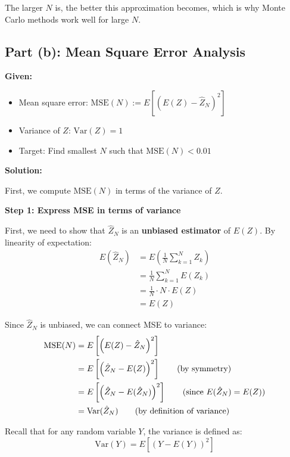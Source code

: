 \documentclass[11pt]{article}
\begin{document}
The larger $N$ is, the better this approximation becomes, which is why Monte Carlo methods work well for large $N$.

\vspace{1em}

\subsection*{Part (b): Mean Square Error Analysis}

\textbf{Given:}
\begin{itemize}[leftmargin=2em]
    \item Mean square error: $\text{MSE}(N) := E\left[\left(E(Z) - \hat{Z}_N\right)^2\right]$
    \item Variance of $Z$: $\text{Var}(Z) = 1$
    \item Target: Find smallest $N$ such that $\text{MSE}(N) < 0.01$
\end{itemize}

\textbf{Solution:}

First, we compute $\text{MSE}(N)$ in terms of the variance of $Z$.

\vspace{0.5em}

\textbf{Step 1: Express MSE in terms of variance}

First, we need to show that $\hat{Z}_N$ is an \textbf{unbiased estimator} of $E(Z)$. By linearity of expectation:
\begin{align*}
E(\hat{Z}_N) &= E\left(\frac{1}{N} \sum_{k=1}^{N} Z_k\right) \\
&= \frac{1}{N} \sum_{k=1}^{N} E(Z_k) \\
&= \frac{1}{N} \cdot N \cdot E(Z) \tag{each $Z_k$ has same distribution as $Z$} \\
&= E(Z)
\end{align*}

Since $\hat{Z}_N$ is unbiased, we can connect MSE to variance:
\begin{align*}
\text{MSE}(N) &= E\left[\left(E(Z) - \hat{Z}_N\right)^2\right] \\
&= E\left[\left(\hat{Z}_N - E(Z)\right)^2\right] \tag{by symmetry} \\
&= E\left[\left(\hat{Z}_N - E(\hat{Z}_N)\right)^2\right] \tag{since $E(\hat{Z}_N) = E(Z)$} \\
&= \text{Var}(\hat{Z}_N) \tag{by definition of variance}
\end{align*}

Recall that for any random variable $Y$, the variance is defined as:
\[
\text{Var}(Y) = E[(Y - E(Y))^2]
\]
\end{document}

